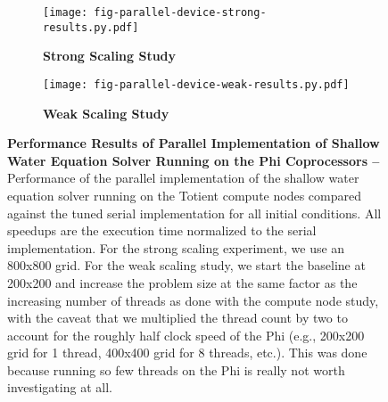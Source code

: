
\begin{figure}[h]

  \begin{minipage}[t]{0.48\tw}
    \begin{subfigure}{\tw}

    \centering
    \texttt{[image: fig-parallel-device-strong-results.py.pdf]}
    \caption{\textbf{Strong Scaling Study}}
    \label{fig-parallel-device-strong-results}

    \end{subfigure}
  \end{minipage}%
  \hfill%
  \begin{minipage}[t]{0.48\tw}
  \begin{subfigure}{\tw}

  \centering
  \texttt{[image: fig-parallel-device-weak-results.py.pdf]}
  \caption{\textbf{Weak Scaling Study}}
  \label{fig-parallel-device-weak-results}

  \end{subfigure}
  \end{minipage}%

  \caption{\textbf{Performance Results of Parallel Implementation of
      Shallow Water Equation Solver Running on the Phi Coprocessors --}
    Performance of the parallel implementation of the shallow water
    equation solver running on the Totient compute nodes compared against
    the tuned serial implementation for all initial conditions. All
    speedups are the execution time normalized to the serial
    implementation. For the strong scaling experiment, we use an 800x800
    grid.  For the weak scaling study, we start the baseline at 200x200
    and increase the problem size at the same factor as the increasing number
    of threads as done with the compute node study, with the caveat that
    we multiplied the thread count by two to account for the roughly half
    clock speed of the Phi (e.g., 200x200 grid for 1 thread, 400x400 grid for
    8 threads, etc.). This was done because running so few threads on the Phi
    is really not worth investigating at all.}

  \label{fig-parallel-device-results}

\end{figure}

